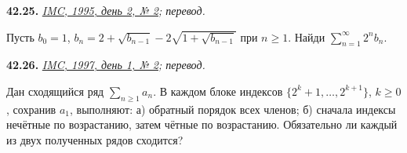 \noindent\begin{minipage}[t]{\linewidth}\textbf{42.25.}\starmark{} {\small\itshape\href{https://www.imc-math.org.uk/imc1995/prob_sol.pdf}{IMC, 1995, день 2, № 2}; перевод.}\par Пусть \(b_0=1\), \(b_n=2+\sqrt{b_{n-1}}-2\sqrt{1+\sqrt{b_{n-1}}}\) при \(n\ge1\). Найди \(\sum_{n=1}^{\infty}2^n b_n\).\par\end{minipage}\par
\noindent\begin{minipage}[t]{\linewidth}\textbf{42.26.}\starmark{} {\small\itshape\href{https://www.imc-math.org.uk/imc1997/prob_sol1.pdf}{IMC, 1997, день 1, № 2}; перевод.}\par Дан сходящийся ряд \(\sum_{n\ge1}a_n\). В каждом блоке индексов \(\{2^k+1,\ldots,2^{k+1}\}\), \(k\ge0\), сохранив \(a_1\), выполняют: а) обратный порядок всех членов; б) сначала индексы нечётные по возрастанию, затем чётные по возрастанию. Обязательно ли каждый из двух полученных рядов сходится?\par\end{minipage}\par
\endgroup
